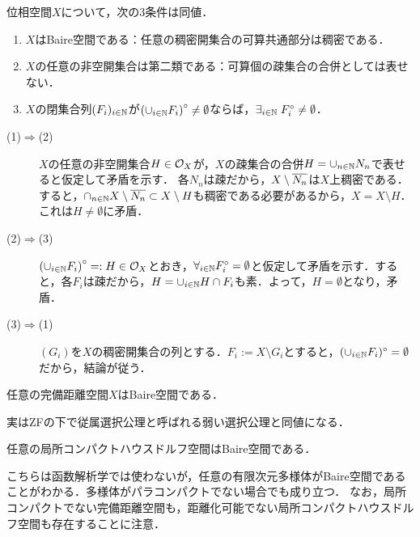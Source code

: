 \documentclass[uplatex,dvipdfmx]{jsreport}
\begin{document}
\begin{theorem}[Baire空間の特徴付け]
    位相空間$X$について，次の3条件は同値．
    \begin{enumerate}
        \item $X$はBaire空間である：任意の稠密開集合の可算共通部分は稠密である．
        \item $X$の任意の非空開集合は第二類である：可算個の疎集合の合併としては表せない．
        \item $X$の閉集合列$(F_i)_{i\in\mathbb{N}}$が$\left(\cup_{i\in\mathbb{N}}F_i\right)^\circ\ne\emptyset$ならば，$\exists_{i\in\mathbb{N}}\;F_i^\circ\ne\emptyset$．
    \end{enumerate}
\end{theorem}
\begin{Proof}\mbox{}
    \begin{description}
        \item[(1)$\Rightarrow$(2)] $X$の任意の非空開集合$H\in\mathcal{O}_X$が，$X$の疎集合の合併$H=\cup_{n\in\mathbb{N}}N_n$で表せると仮定して矛盾を示す．
        各$N_n$は疎だから，$X\setminus\overline{N_n}$は$X$上稠密である．
        すると，$\cap_{n\in\mathbb{N}}X\setminus\overline{N_n}\subset X\setminus H$も稠密である必要があるから，$X=X\setminus H$．これは$H\ne\emptyset$に矛盾．
        \item[(2)$\Rightarrow$(3)] $\left(\cup_{i\in\mathbb{N}}F_i\right)^\circ=:H\in\mathcal{O}_X$とおき，$\forall_{i\in\mathbb{N}}F_i^\circ=\emptyset$と仮定して矛盾を示す．すると，各$F_i$は疎だから，$H=\cup_{i\in\mathbb{N}}H\cap F_i$も素．よって，$H=\emptyset$となり，矛盾．
        \item[(3)$\Rightarrow$(1)] $(G_i)$を$X$の稠密開集合の列とする．$F_i:=X\setminus G_i$とすると，$(\cup_{i\in\mathbb{N}}F_i)^\circ=\emptyset$だから，結論が従う．
    \end{description}
\end{Proof}

\begin{proposition}
    任意の完備距離空間$X$はBaire空間である．
\end{proposition}
\begin{remark}
    実はZFの下で従属選択公理と呼ばれる弱い選択公理と同値になる．
\end{remark}

\begin{proposition}
    任意の局所コンパクトハウスドルフ空間はBaire空間である．
\end{proposition}
\begin{remarks}
    こちらは函数解析学では使わないが，任意の有限次元多様体がBaire空間であることがわかる．多様体がパラコンパクトでない場合でも成り立つ．
    なお，局所コンパクトでない完備距離空間も，距離化可能でない局所コンパクトハウスドルフ空間も存在することに注意．
\end{remarks}
\end{document}
